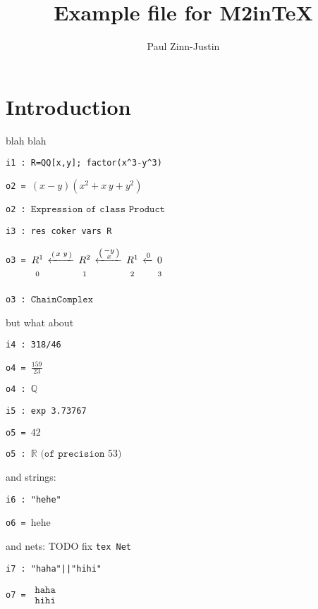 \documentclass[12pt,a4paper]{amsart}
\title{Example file for M2inTeX}
\author{Paul Zinn-Justin}
\begin{document}
\maketitle

\section{Introduction}
blah blah
\smallskip
\begin{verbatim}
i1 : R=QQ[x,y]; factor(x^3-y^3)
\end{verbatim}
\noindent\verb|o2 = |$\left(x-y\right)\left(x^{  2}+x\,y+y^{  2}\right)$

\noindent\verb|o2 : |$\texttt{Expression}\texttt{ of class }\texttt{Product}$
\begin{verbatim}
i3 : res coker vars R
\end{verbatim}
\noindent\verb|o3 = |$\underset{\vphantom{\Big|}0}{R^{  1}}\,\xleftarrow{\left(\begin{smallmatrix}
x&y\\
\end{smallmatrix}\right)}\,\underset{\vphantom{\Big|}1}{R^{  2}}\,\xleftarrow{\left(\begin{smallmatrix}
-y\\
x\\
\end{smallmatrix}\right)}\,\underset{\vphantom{\Big|}2}{R^{  1}}\,\xleftarrow{0}\,\underset{\vphantom{\Big|}3}{0}$

\noindent\verb|o3 : |$\texttt{ChainComplex}$
\smallskip

but what about
\smallskip
\begin{verbatim}
i4 : 318/46
\end{verbatim}
\noindent\verb|o4 = |$\frac{159}{ 23}$

\noindent\verb|o4 : |${\mathbb Q}$
\begin{verbatim}
i5 : exp 3.73767
\end{verbatim}
\noindent\verb|o5 = |${42}$

\noindent\verb|o5 : |${\mathbb R}\texttt{ (of precision } 53\texttt{)}$
\smallskip

and strings:
\smallskip
\begin{verbatim}
i6 : "hehe"
\end{verbatim}
\noindent\verb|o6 = |hehe
\smallskip

and nets: TODO fix {\tt tex Net}
\smallskip
\begin{verbatim}
i7 : "haha"||"hihi"
\end{verbatim}
\noindent\verb|o7 = |$\begin{array}{l}\texttt{haha}\\
\texttt{hihi}\end{array}$
\smallskip
\end{document}
